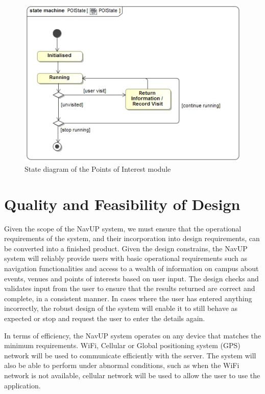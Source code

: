 \documentclass[12pt,a4paper]{article}
\begin{document}
	\begin{figure}
		\includegraphics[width=\linewidth]{Images/POIState.jpg}
		\caption{State diagram of the Points of Interest module}
	\end{figure}
	
\section{Quality and Feasibility of Design}
Given the scope of the NavUP system, we must ensure that the operational requirements of the system, and their incorporation into design requirements, can be converted into a finished product. Given the design constrains, the NavUP system will reliably provide users with basic operational requirements such as navigation functionalities and access to a wealth of information on campus about events, venues and points of interests based on user input. The design checks and validates input from the user to ensure that the results returned are correct and complete, in a consistent manner. In cases where the user has entered anything incorrectly, the robust design of the system will enable it to still behave as expected or stop and request the user to enter the details again. \newline

In terms of efficiency, the NavUP system operates on any device that matches the minimum requirements. WiFi, Cellular or Global positioning system (GPS) network will be used to communicate efficiently with the server. The system will also be able to perform under abnormal conditions, such as when the WiFi network is not available, cellular network will be used to allow the user to use the application. \newline
\end{document}
